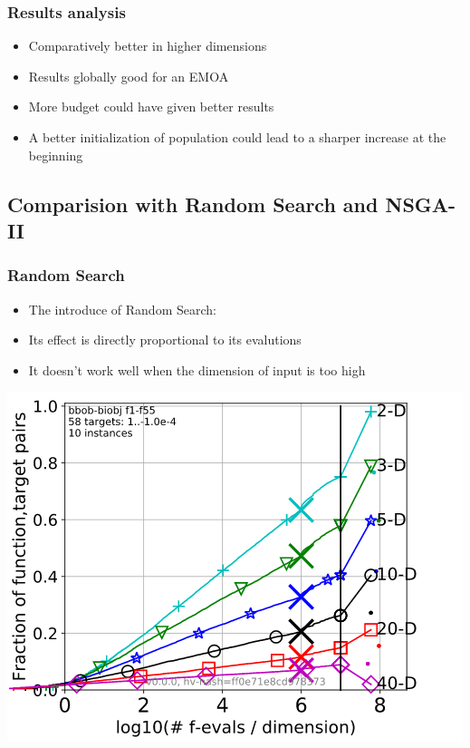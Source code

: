 \documentclass{beamer}
\begin{document}
\begin{frame}
  \frametitle{Results analysis}
  \begin{itemize}
  \item Comparatively better in higher dimensions
  \item Results globally good for an EMOA
  \end{itemize}
  \begin{itemize}
  \item More budget could have given better results
  \item A better initialization of population could lead to a sharper increase
    at the beginning
  \end{itemize}
\end{frame}

\subsection{Comparision with Random Search and NSGA-II}

\begin{frame}
\frametitle{Random Search}
\begin{itemize}
\item The introduce of Random Search:
\item Its effect is directly proportional to its evalutions
\item It doesn't work well when the dimension of input is too high
\end{itemize}
\centering \includegraphics[scale=0.35]{Random.png}

\end{frame}
\end{document}
